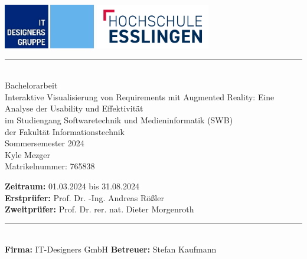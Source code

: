 \newcommand{\HRule}[2]{\noindent\rule[#1]{\linewidth}{#2}} %
\newcommand{\vlinespace}[1]{\vspace*{#1\baselineskip}} %
\newcommand{\titleemph}[1]{\textbf{#1}} %

\begin{titlepage}
 \sffamily %
      \includegraphics[width=4cm]{images/it-d_logo.png}
      \hfill \includegraphics[width=5cm]{images/hslogo_small.png}
      \HRule{13pt}{1pt} 
   \centering
      \Large
      \vlinespace{3}\\
      Bachelorarbeit\\
      \huge
      Interaktive Visualisierung von Requirements mit Augmented Reality: Eine Analyse der Usability und Effektivität\\
%
      \Large
      \vlinespace{2}
          im Studiengang Softwaretechnik und Medieninformatik (SWB)\\
          der Fakultät Informationstechnik\\
%      
      Sommersemester 2024\\
%     
      \vlinespace{2}
      Kyle Mezger\\
      Matrikelnummer: 765838
%
   \vfill
   \raggedright
%   
   \large
  \titleemph{Zeitraum:} 01.03.2024 bis 31.08.2024 \\ %
   \titleemph{Erstprüfer:} Prof. Dr. -Ing. Andreas Rößler \\
   \titleemph{Zweitprüfer:} Prof. Dr. rer. nat. Dieter Morgenroth \\

   \vlinespace{1}
   \HRule{13pt}{1pt} \\
   \titleemph{Firma:} IT-Designers GmbH 
   \hfill \titleemph{Betreuer:} Stefan Kaufmann

\end{titlepage}
